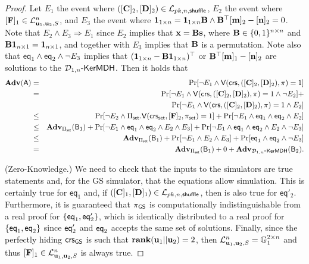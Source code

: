 \begin{proof}
Let $E_1$ the event where $([\mathbf{{C}}]_2,[\mathbf{{D}}]_2)\in\mathcal{L}_{pk,n,\mathsf{shuffle}}$, $E_2$ the event where $[\mathbf{{F}}]_1\in\mathcal{L}_{\mathbf{u}_1,\mathbf{u}_2,S}^n$, and $E_3$ the event where $\mathbf{{1}}_{1\times n}=\mathbf{{1}}_{1\times n}\mathbf{{B}}\wedge\mathbf{{B}}^\top[\mathbf{m}]_2-[\mathbf{n}]_2=0$. Note that $E_2\wedge E_3\Longrightarrow E_1$ since $E_2$ implies that $\mathbf{x}=\mathbf{{B}}\mathbf{s}$, where $\mathbf{{B}}\in\{0,1\}^{n\times n}$ and $\mathbf{{B}}\mathbf{{1}}_{n\times 1}=\mathbf{{1}}_{n\times 1}$, and together with $E_3$ implies that $\mathbf{{B}}$ is a permutation. Note also that $\mathsf{eq}_1\wedge\mathsf{eq}_2\wedge\neg E_3$ implies that $(\mathbf{{1}}_{1\times n}-\mathbf{{B}}\mathbf{{1}}_{1\times n})^\top$ or $\mathbf{{B}}^\top[\mathbf{m}]_1-[\mathbf{n}]_2$ are solutions to the $\mathcal{D}_{1,n}\mbox{-}\mathsf{KerMDH}$. Then it holds that
\begin{eqnarray*}
\mathbf{Adv}(\mathsf{A}) & = &
    \Pr[\neg E_1 \wedge \mathsf{V}(\mathsf{crs},([\mathbf{{C}}]_2,[\mathbf{{D}}]_2),\pi)=1]\\
& = &
    \Pr[\neg E_1 \wedge \mathsf{V}(\mathsf{crs},([\mathbf{{C}}]_2,[\mathbf{{D}}]_2),\pi)=1 \wedge \neg E_2]+\\
& &
    \Pr[\neg E_1 \wedge \mathsf{V}(\mathsf{crs},([\mathbf{{C}}]_2,[\mathbf{{D}}]_2),\pi)=1 \wedge E_2]\\
& \leq &
    \Pr[\neg E_2 \wedge \Pi_{\mathsf{set}}.\mathsf{V}(\mathsf{crs}_{\mathsf{set}},[\mathbf{{F}}]_2,\pi_{\mathsf{set}})=1]+
    \Pr[\neg E_1 \wedge \mathsf{eq}_1 \wedge \mathsf{eq}_2 \wedge E_2]\\
& \leq &
    \mathbf{Adv}_{\Pi_{\mathsf{set}}}(\mathsf{B}_1)+\Pr[\neg E_1 \wedge \mathsf{eq}_1 \wedge \mathsf{eq}_2 \wedge E_2\wedge E_3] + \Pr[\neg E_1 \wedge \mathsf{eq}_1 \wedge \mathsf{eq}_2 \wedge E_2\wedge \neg E_3]\\
& \leq &
    \mathbf{Adv}_{\Pi_{\mathsf{set}}}(\mathsf{B}_1) + \Pr[\neg E_1\wedge E_2 \wedge E_3]+
    \Pr[\mathsf{eq}_1\wedge\mathsf{eq}_2\wedge\neg E_3]\\
& = &
    \mathbf{Adv}_{\Pi_{\mathsf{set}}}(\mathsf{B}_1)+0+\mathbf{Adv}_{\mathcal{D}_{1,n}\mbox{-}\mathsf{KerMDH}}(\mathsf{B}_2).
\end{eqnarray*} 

(Zero-Knowledge.) We need to check that the inputs to the simulators are true statements and, for the GS simulator, that the equations allow simulation. This is certainly true for $\mathsf{eq}_1$ and, if $([\mathbf{{C}}]_1,[\mathbf{{D}}]_1)\in\mathcal{L}_{pk,n,\mathsf{shuffle}}$, then is also true for $\mathsf{eq}'_2$. Furthermore, it is guaranteed that $\pi_{\mathsf{GS}}$ is computationally indistinguishable from a real proof for $\{\mathsf{eq}_1,\mathsf{eq}'_2\}$, which is identically distributed to a real proof for $\{\mathsf{eq}_1,\mathsf{eq}_2\}$ since $\mathsf{eq}'_2$ and $\mathsf{eq}_2$ accepts the same set of solutions.
Finally, since the perfectly hiding $\mathsf{crs}_{\mathsf{GS}}$ is such that $\mathbf{rank}(\mathbf{u}_1||\mathbf{u}_2)=2$, then $\mathcal{L}_{\mathbf{u}_1,\mathbf{u}_2,S}^n=\mathbb{G}_1^{2\times n}$ and thus $[\mathbf{{F}}]_1\in\mathcal{L}_{\mathbf{u}_1,\mathbf{u}_2,S}^n$ is always true.
\end{proof}
